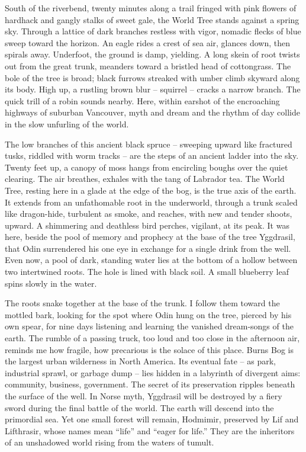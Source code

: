 \documentclass[10pt,DIV09,letterpaper,oneside,headsepline]{scrreprt}
\begin{document}
South of the riverbend, twenty minutes along a trail fringed with pink
flowers of hardhack and gangly stalks of sweet gale, the World Tree
stands against a spring sky. Through a lattice of dark branches
restless with vigor, nomadic flecks of blue sweep toward the horizon.
An eagle rides a crest of sea air, glances down, then spirals away.
Underfoot, the ground is damp, yielding. A long skein of root twists
out from the great trunk, meanders toward a bristled head of
cottongrass. The bole of the tree is broad; black furrows streaked
with umber climb skyward along its body. High up, a rustling brown
blur -- squirrel -- cracks a narrow branch. The quick trill of a robin
sounds nearby. Here, within earshot of the encroaching highways of
suburban Vancouver, myth and dream and the rhythm of day collide in
the slow unfurling of the world. 

The low branches of this ancient black spruce -- sweeping upward like fractured tusks, riddled with worm tracks -- are the steps of an ancient ladder into the sky. Twenty feet up, a canopy of moss hangs from encircling boughs over the quiet clearing. The air breathes, exhales with the tang of Labrador tea. The World Tree, resting here in a glade at the edge of the bog, is the true axis of the earth. It extends from an unfathomable root in the underworld, through a trunk scaled like dragon-hide, turbulent as smoke, and reaches, with new and tender shoots, upward. A shimmering and deathless bird perches, vigilant, at its peak. It was here, beside the pool of memory and prophecy at the base of the tree Yggdrasil, that Odin surrendered his one eye in exchange for a single drink from the well. Even now, a pool of dark, standing water lies at the bottom of a hollow between two intertwined roots. The hole is lined with black soil. A small blueberry leaf spins slowly in the water.

The roots snake together at the base of the trunk. I follow them toward the mottled bark, looking for the spot where Odin hung on the tree, pierced by his own spear, for nine days listening and learning the vanished dream-songs of the earth. The rumble of a passing truck, too loud and too close in the afternoon air, reminds me how fragile, how precarious is the solace of this place. Burns Bog is the largest urban wilderness in North America. Its eventual fate -- as park, industrial sprawl, or garbage dump -- lies hidden in a labyrinth of divergent aims: community, business, government. The secret of its preservation ripples beneath the surface of the well. In Norse myth, Yggdrasil will be destroyed by a fiery sword during the final battle of the world. The earth will descend into the primordial sea. Yet one small forest will remain, Hodmimir, preserved by Lif and Lifthrasir, whose names mean ``life'' and ``eager for life.'' They are the inheritors of an unshadowed world rising from the waters of tumult.
\end{document}
